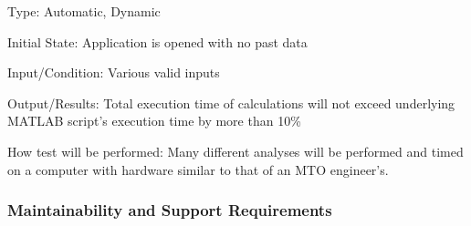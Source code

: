 \documentclass[12pt, titlepage]{article}
\begin{document}
\begin{enumerate}
Type: Automatic, Dynamic

Initial State: Application is opened with no past data

Input/Condition: Various valid inputs

Output/Results: Total execution time of calculations will not exceed underlying MATLAB script's execution time by more than 10\%

How test will be performed: Many different analyses will be performed and timed on a computer with hardware similar to that of an MTO engineer's.

\end{enumerate}

\subsubsection{Maintainability and Support Requirements}
\end{document}
